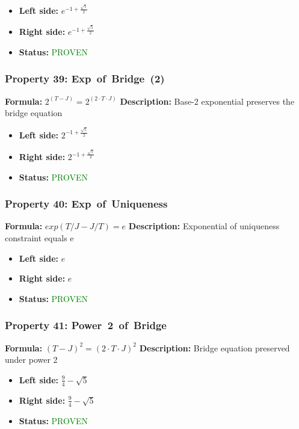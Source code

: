 \begin{itemize}
\item \textbf{Left side:} $e^{-1 + \frac{\sqrt{5}}{2}}$
\item \textbf{Right side:} $e^{-1 + \frac{\sqrt{5}}{2}}$
\item \textbf{Status:} \textcolor{green}{PROVEN}
\end{itemize}

\subsubsection*{Property 39: Exp~of~Bridge~(2)}
\textbf{Formula:} $2^(T-J) = 2^(2 \cdot T \cdot J)$
\textbf{Description:} Base-2 exponential preserves the bridge equation

\begin{itemize}
\item \textbf{Left side:} $2^{-1 + \frac{\sqrt{5}}{2}}$
\item \textbf{Right side:} $2^{-1 + \frac{\sqrt{5}}{2}}$
\item \textbf{Status:} \textcolor{green}{PROVEN}
\end{itemize}

\subsubsection*{Property 40: Exp~of~Uniqueness}
\textbf{Formula:} $exp(T/J - J/T) = e$
\textbf{Description:} Exponential of uniqueness constraint equals e

\begin{itemize}
\item \textbf{Left side:} $e$
\item \textbf{Right side:} $e$
\item \textbf{Status:} \textcolor{green}{PROVEN}
\end{itemize}

\subsubsection*{Property 41: Power~2~of~Bridge}
\textbf{Formula:} $(T-J)^2 = (2 \cdot T \cdot J)^2$
\textbf{Description:} Bridge equation preserved under power 2

\begin{itemize}
\item \textbf{Left side:} $\frac{9}{4} - \sqrt{5}$
\item \textbf{Right side:} $\frac{9}{4} - \sqrt{5}$
\item \textbf{Status:} \textcolor{green}{PROVEN}
\end{itemize}


